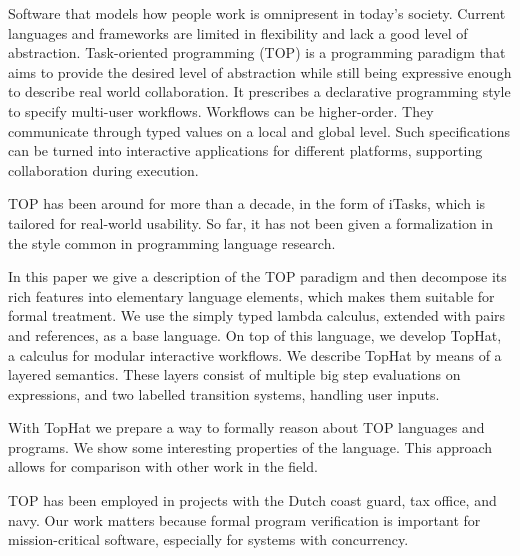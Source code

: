 
Software that models how people work is omnipresent in today's society.
Current languages and frameworks are limited in flexibility and lack a good level of abstraction.
Task-oriented programming (TOP) is a programming paradigm that aims to provide the desired level of abstraction while still being expressive enough to describe real world collaboration.
It prescribes a declarative programming style to specify multi-user workflows.
Workflows can be higher-order.
They communicate through typed values on a local and global level.
Such specifications can be turned into interactive applications for different platforms, supporting collaboration during execution.

TOP has been around for more than a decade, in the form of iTasks, which is tailored for real-world usability.
So far, it has not been given a formalization in the style common in programming language research.

In this paper we give a description of the TOP paradigm and then decompose its rich features into elementary language elements, which makes them suitable for formal treatment.
We use the simply typed lambda calculus, extended with pairs and references, as a base language.
On top of this language, we develop TopHat, a calculus for modular interactive workflows.
We describe TopHat by means of a layered semantics.
These layers consist of multiple big step evaluations on expressions, and two labelled transition systems, handling user inputs.

With TopHat we prepare a way to formally reason about TOP languages and programs.
We show some interesting properties of the language.
This approach allows for comparison with other work in the field.


TOP has been employed in projects with the Dutch coast guard, tax office, and navy.
Our work matters because formal program verification is important for mission-critical software, especially for systems with concurrency.




